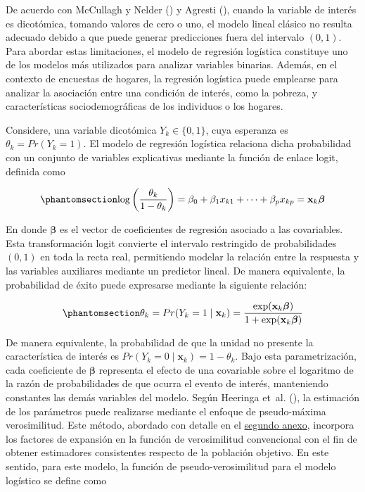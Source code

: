 \documentclass[
  spanish,
  11pt,
  letterpaper,
  oneside,
  open=any]{scrbook}
\begin{document}
De acuerdo con McCullagh y Nelder
() y Agresti
(), cuando la variable de interés
es dicotómica, tomando valores de cero o uno, el modelo lineal clásico
no resulta adecuado debido a que puede generar predicciones fuera del
intervalo \((0,1)\). Para abordar estas limitaciones, el modelo de
regresión logística constituye uno de los modelos más utilizados para
analizar variables binarias. Además, en el contexto de encuestas de
hogares, la regresión logística puede emplearse para analizar la
asociación entre una condición de interés, como la pobreza, y
características sociodemográficas de los individuos o los hogares.

Considere, una variable dicotómica \(Y_k \in \{0,1\}\), cuya esperanza
es \(\theta_k=Pr(Y_k=1)\). El modelo de regresión logística relaciona
dicha probabilidad con un conjunto de variables explicativas mediante la
función de enlace logit, definida como

\begin{equation}\protect\phantomsection\label{eq-modelo-logistico}{
\log\left(\frac{\theta_k}{1-\theta_k}\right)
=
\beta_0+\beta_1x_{k1}+\cdots+\beta_px_{kp}
=\mathbf{x}_{k}\boldsymbol{\beta}
}\end{equation}

En donde \(\boldsymbol{\beta}\) es el vector de coeficientes de
regresión asociado a las covariables. Esta transformación logit
convierte el intervalo restringido de probabilidades \((0,1)\) en toda
la recta real, permitiendo modelar la relación entre la respuesta y las
variables auxiliares mediante un predictor lineal. De manera
equivalente, la probabilidad de éxito puede expresarse mediante la
siguiente relación:

\begin{equation}\protect\phantomsection\label{eq-probabilidad-logistica}{
\theta_k
=
Pr(Y_k = 1 \mid \mathbf{x}_k)
=
\frac{\exp(\mathbf{x}_k\boldsymbol{\beta})}
     {1+\exp(\mathbf{x}_k\boldsymbol{\beta})}
}\end{equation}

De manera equivalente, la probabilidad de que la unidad no presente la
característica de interés es
\(Pr(Y_k = 0 \mid \mathbf{x}_k) = 1-\theta_k\). Bajo esta
parametrización, cada coeficiente de \(\boldsymbol{\beta}\) representa
el efecto de una covariable sobre el logaritmo de la razón de
probabilidades de que ocurra el evento de interés, manteniendo
constantes las demás variables del modelo. Según Heeringa et~al.
(), la estimación de los
parámetros puede realizarse mediante el enfoque de pseudo-máxima
verosimilitud. Este método, abordado con detalle en el
\hyperref[ap2]{segundo anexo}, incorpora los factores de expansión en la
función de verosimilitud convencional con el fin de obtener estimadores
consistentes respecto de la población objetivo. En este sentido, para
este modelo, la función de pseudo-verosimilitud para el modelo logístico
se define como
\end{document}
